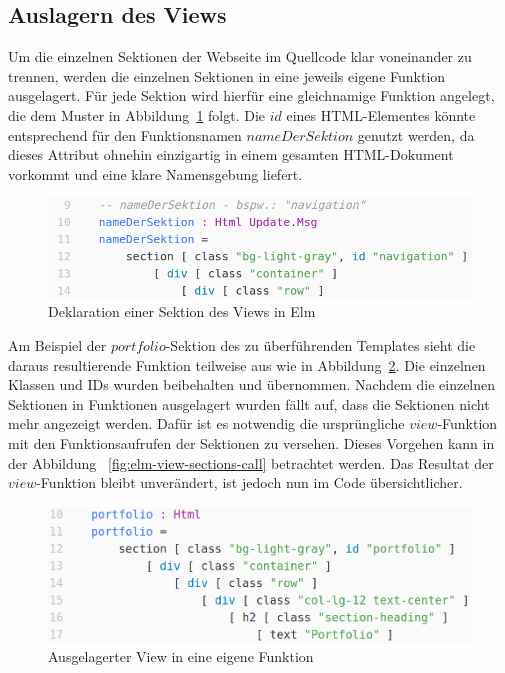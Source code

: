 \subsection{Auslagern des Views}
\label{sec:auslagern-des-views}
Um die einzelnen Sektionen der Webseite im Quellcode klar voneinander zu trennen, werden die einzelnen Sektionen in eine jeweils eigene Funktion ausgelagert.
Für jede Sektion wird hierfür eine gleichnamige Funktion angelegt, die dem Muster in Abbildung~\ref{fig:elm-view-section} folgt. Die $id$ eines \ac{HTML}-Elementes könnte entsprechend für den Funktionsnamen $nameDerSektion$ genutzt werden, da dieses Attribut ohnehin einzigartig in einem gesamten \ac{HTML}-Dokument vorkommt und eine klare Namensgebung liefert.
\begin{figure}[htb]
\centering
\includegraphics[scale=0.53]{img/elm-html-sections.png}
\caption{Deklaration einer Sektion des Views in Elm}\label{fig:elm-view-section}
\end{figure}
Am Beispiel der $portfolio$-Sektion des zu überführenden Templates sieht die daraus resultierende Funktion teilweise aus wie in Abbildung~\ref{fig:elm-view-section-function}. Die einzelnen Klassen und \ac{ID}s wurden beibehalten und übernommen. Nachdem die einzelnen Sektionen in Funktionen ausgelagert wurden fällt auf, dass die Sektionen nicht mehr angezeigt werden. Dafür ist es notwendig die ursprüngliche $view$-Funktion mit den Funktionsaufrufen der Sektionen zu versehen. Dieses Vorgehen kann in der Abbildung ~\ref{fig:elm-view-sections-call} betrachtet werden. Das Resultat der $view$-Funktion bleibt unverändert, ist jedoch nun im Code übersichtlicher.
\begin{figure}[h]
\centering
\includegraphics[scale=0.41]{img/elm-view-portfolio-section-function.png}
\caption{Ausgelagerter View in eine eigene Funktion}\label{fig:elm-view-section-function}
\end{figure}

